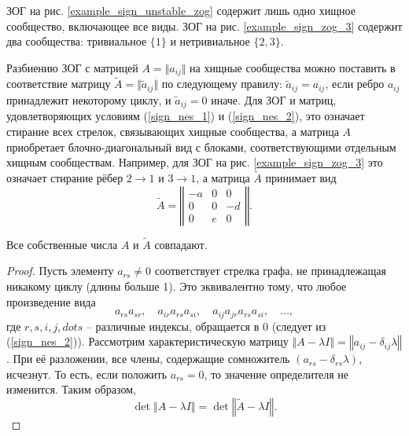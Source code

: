     ЗОГ на рис. \ref{example_sign_unstable_zog} содержит лишь одно хищное сообщество, включающее все виды. ЗОГ на рис. \ref{example_sign_zog_3} содержит два сообщества: тривиальное \(\{1\}\) и нетривиальное \(\{2,3\}\).

    Разбиению ЗОГ с матрицей \(A = \Vert a_{ij} \Vert\) на хищные сообщества можно поставить в соответствие матрицу \(\widetilde{A} = \Vert \widetilde{a}_{ij} \Vert\) по следующему правилу: \(\widetilde{a}_{ij} = a_{ij}\), если ребро \(a_{ij}\) принадлежит некоторому циклу, и \(\widetilde{a}_{ij} = 0\) иначе. Для ЗОГ и матриц, удовлетворяющих условиям (\ref{sign_nes_1}) и (\ref{sign_nes_2}), это означает стирание всех стрелок, связывающих хищные сообщества, а матрица \(A\) приобретает блочно-диагональный вид с блоками, соответствующими отдельным хищным сообществам. Например, для ЗОГ на рис. \ref{example_sign_zog_3} это означает стирание рёбер \(2 \to 1\) и \(3 \to 1\), а матрица \(\widetilde{A}\) принимает вид
    \begin{equation*}
        \widetilde{A} = \left\Vert \begin{array}{c|cc}
            -a & 0 & 0 \\ \hline
            0 & 0 & -d \\
            0 & e & 0 
        \end{array} \right\Vert.
    \end{equation*}

    \begin{lemma} \label{lemma_a_tilde_a}
        Все собственные числа \(A\) и \(\widetilde{A}\) совпадают.
    \end{lemma}

    \begin{proof}
        Пусть элементу \(a_{rs} \neq 0\) соответствует стрелка графа, не принадлежащая никакому циклу (длины больше 1). Это эквивалентно тому, что любое произведение вида
        \begin{equation*}
            a_{rs} a_{sr}, \quad a_{ir} a_{rs} a_{si}, \quad a_{ij} a_{jr} a_{rs} a_{si}, \quad \dots,
        \end{equation*}
        где \(r,s,i,j,dots\) -- различные индексы, обращается в 0 (следует из (\ref{sign_nes_2})).
        Рассмотрим характеристическую матрицу \(\left\Vert A - \lambda I \right\Vert = \left\Vert a_{ij} - \delta_{ij} \lambda \right\Vert\). При её разложении, все члены, содержащие сомножитель \((a_{rs} - \delta_{rs} \lambda)\), исчезнут. То есть, если положить \(a_{rs} = 0\), то значение определителя не изменится. Таким образом,
        \begin{equation*}
            \det \left\Vert A - \lambda I \right\Vert = \det \left\Vert \widetilde{A} - \lambda I \right\Vert.
        \end{equation*}
    \end{proof}

